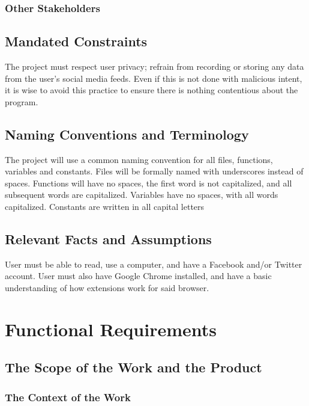 \documentclass[12pt, titlepage]{article}
\begin{document}
\subsubsection{Other Stakeholders}

\subsection{Mandated Constraints}

The project must respect user privacy; refrain from recording or storing any data from the user's social media feeds. Even if this is not done with malicious intent, it is wise to avoid this practice to ensure there is nothing contentious about the program. 

\subsection{Naming Conventions and Terminology}

The project will use a common naming convention for all files, functions, variables and constants. Files will be formally named with underscores instead of spaces. Functions will have no spaces, the first word is not capitalized, and all subsequent words are capitalized. Variables have no spaces, with all words capitalized. Constants are written in all capital letters 

\subsection{Relevant Facts and Assumptions}

User must be able to read, use a computer, and have a Facebook and/or Twitter account. User must also have Google Chrome installed, and have a basic understanding of how extensions work for said browser.

\section{Functional Requirements}

\subsection{The Scope of the Work and the Product}

\subsubsection{The Context of the Work}
\end{document}
